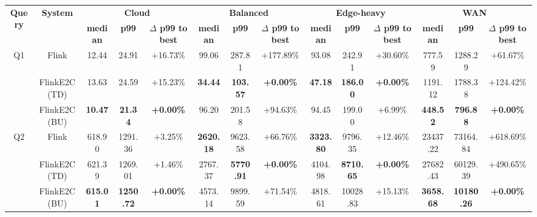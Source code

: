 \begin{tabular}{@{} c c c c c c c c c c c c c c @{}}
  \toprule
  \multirow{2}{*}{\textbf{Query}} & \multirow{2}{*}{\textbf{System}} & \multicolumn{3}{c}{\textbf{Cloud}} & \multicolumn{3}{c}{\textbf{Balanced}} & \multicolumn{3}{c}{\textbf{Edge-heavy}} & \multicolumn{3}{c}{\textbf{WAN}} \\
  \cmidrule(lr){3-5} \cmidrule(lr){6-8} \cmidrule(lr){9-11} \cmidrule(lr){12-14}
   &  & \textbf{median} & \textbf{p99} & \textbf{$\Delta$ p99 to best} & \textbf{median} & \textbf{p99} & \textbf{$\Delta$ p99 to best} & \textbf{median} & \textbf{p99} & \textbf{$\Delta$ p99 to best} & \textbf{median} & \textbf{p99} & \textbf{$\Delta$ p99 to best} \\
  \midrule
  \multirow{3}{*}{Q1} & Flink & \num{12.44} & \num{24.91} & +\num{16.73}\% & \num{99.06} & \num{287.81} & +\num{177.89}\% & \num{93.08} & \num{242.91} & +\num{30.60}\% & \num{777.59} & \num{1288.29} & +\num{61.67}\% \\
   & FlinkE2C (TD) & \num{13.63} & \num{24.59} & +\num{15.23}\% & {\bfseries \num{34.44}} & {\bfseries \num{103.57}} & {\bfseries +\num{0.00}\%} & {\bfseries \num{47.18}} & {\bfseries \num{186.00}} & {\bfseries +\num{0.00}\%} & \num{1191.12} & \num{1788.38} & +\num{124.42}\% \\
   & FlinkE2C (BU) & {\bfseries \num{10.47}} & {\bfseries \num{21.34}} & {\bfseries +\num{0.00}\%} & \num{96.20} & \num{201.58} & +\num{94.63}\% & \num{94.45} & \num{199.00} & +\num{6.99}\% & {\bfseries \num{448.52}} & {\bfseries \num{796.88}} & {\bfseries +\num{0.00}\%} \\
  \cmidrule(lr){1-14}
  \multirow{3}{*}{Q2} & Flink & \num{618.90} & \num{1291.36} & +\num{3.25}\% & {\bfseries \num{2620.18}} & \num{9623.58} & +\num{66.76}\% & {\bfseries \num{3323.80}} & \num{9796.35} & +\num{12.46}\% & \num{23437.22} & \num{73164.84} & +\num{618.69}\% \\
   & FlinkE2C (TD) & \num{621.39} & \num{1269.01} & +\num{1.46}\% & \num{2767.37} & {\bfseries \num{5770.91}} & {\bfseries +\num{0.00}\%} & \num{4104.98} & {\bfseries \num{8710.65}} & {\bfseries +\num{0.00}\%} & \num{27682.43} & \num{60129.39} & +\num{490.65}\% \\
   & FlinkE2C (BU) & {\bfseries \num{615.01}} & {\bfseries \num{1250.72}} & {\bfseries +\num{0.00}\%} & \num{4573.14} & \num{9899.59} & +\num{71.54}\% & \num{4818.61} & \num{10028.83} & +\num{15.13}\% & {\bfseries \num{3658.68}} & {\bfseries \num{10180.26}} & {\bfseries +\num{0.00}\%} \\

\end{tabular}
